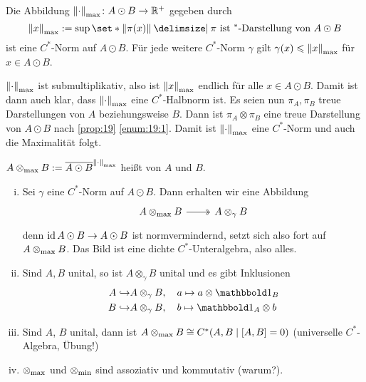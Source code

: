 \begin{definitionP}[{name=[{Max-Norm}]}]
	Die Abbildung $\norm*{\cdot }_{\max} \colon A \odot B \to \mathbb{R}^+$ gegeben durch
	\[
		\norm*{x}_{\max} := \sup \set*{\norm*{\pi(x)} \given \pi \text{ ist $^*$-Darstellung von } A \odot B}
	\] 
	ist eine $C^*$-Norm auf $A \odot B$.
	Für jede weitere $C^*$-Norm $\gamma$ gilt $\gamma(x) \le \norm*{x}_{\max}$ für $x \in A \odot B$.
\end{definitionP}
\begin{beweis}
	$\norm*{\cdot}_{\max}$ ist submultiplikativ, also ist $\norm*{x}_{\max}$ endlich für alle $x \in A \odot B$.
	Damit ist dann auch klar, dass $\norm*{\cdot}_{\max}$ eine $C^*$-Halbnorm ist.
	Es seien nun $\pi_A, \pi_B$ treue Darstellungen von $A$ beziehungsweise $B$.
	Dann ist $\pi_A \otimes \pi_B$ eine treue Darstellung von $A \odot B$ nach \autoref{prop:19} \ref{enum:19:1}.
	Damit ist $\norm*{\cdot}_{\max}$ eine $C^*$-Norm und auch die Maximalität folgt.
\end{beweis}

\begin{definition}[{name=[{maximales Tensorprodukt}]}]
	$A \tensormax B := \overline{A \odot B}^{\norm*{\cdot }_{\max}}$ heißt  von $A$ und $B$. 
\end{definition}

\begin{bemerkung}
	\begin{enumerate}[(i)]
		\item Sei $\gamma$ eine $C^*$-Norm auf $A \odot B$.
		Dann erhalten wir eine Abbildung
		\[
			\begin{tikzcd}
				A \tensormax B \rar[two heads] & A \otimes_\gamma B
			\end{tikzcd}
		\]
		denn $\id A \odot B \to A \odot B$ ist normvermindernd, setzt sich also fort auf $A \tensormax B$.
		Das Bild ist eine dichte $C^*$-Unteralgebra, also alles.
		\item Sind $A,B$ unital, so ist $A \otimes_\gamma B$ unital und es gibt Inklusionen
		\begin{align}
			A \hookrightarrow &A \otimes_\gamma B , \quad a \mapsto a \otimes \ind_B \\
			B \hookrightarrow &A \otimes_\gamma B , \quad b \mapsto \ind_A \otimes b
		\end{align}
		\item Sind $A$, $B$ unital, dann ist $A \tensormax B \cong C^* \enbrace*{A,B \mid \benbrace*{A,B}=0}$ (universelle $C^*$-Algebra, Übung!)
		\item $\tensormax $ und $\tensormin$ sind assoziativ und kommutativ (warum?).
	\end{enumerate}
\end{bemerkung}

